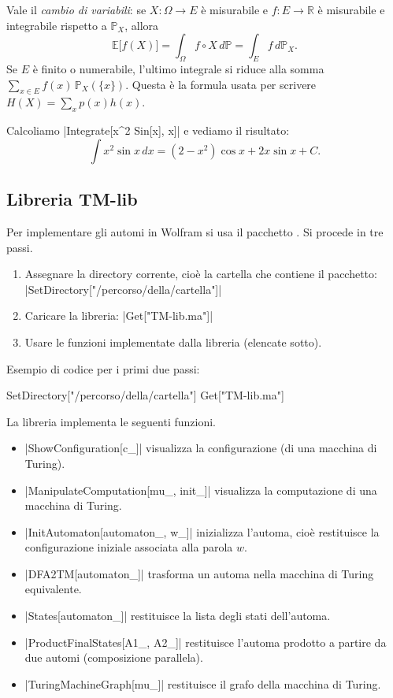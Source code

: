 \begin{rema}
Vale il \textit{cambio di variabili}: se $X\colon\Omega\to E$ è misurabile e $f\colon E\to\mathbb{R}$ è misurabile e integrabile rispetto a $\mathbb{P}_X$, allora
\[
\mathbb{E}\big[f(X)\big] = \int_{\Omega} f\circ X\, d\mathbb{P} = \int_{E} f\, d\mathbb{P}_X.
\]
Se $E$ è finito o numerabile, l'ultimo integrale si riduce alla somma $\sum_{x\in E} f(x)\,\mathbb{P}_X(\{x\})$. Questa è la formula usata per scrivere $H(X)=\sum_x p(x)h(x)$.
\end{rema}
\begin{rema}
Calcoliamo \wolfram|Integrate[x^2 Sin[x], x]| e vediamo il risultato:
\[
\int x^2 \sin x \, dx = (2 - x^2)\cos x + 2x \sin x + C.
\]
\end{rema}
\subsection{Libreria TM-lib}
\begin{defi}
Per implementare gli automi in Wolfram si usa il pacchetto . Si procede in tre passi.
\begin{enumerate}
\item Assegnare la directory corrente, cioè la cartella che contiene il pacchetto: \wolfram|SetDirectory["/percorso/della/cartella"]|
\item Caricare la libreria: \wolfram|Get["TM-lib.ma"]|
\item Usare le funzioni implementate dalla libreria (elencate sotto).
\end{enumerate}
\end{defi}
\begin{rema}
Esempio di codice per i primi due passi:
\begin{walfram}
SetDirectory["/percorso/della/cartella"]
Get["TM-lib.ma"]
\end{walfram}
\end{rema}
\begin{defi}
La libreria implementa le seguenti funzioni.
\begin{itemize}
\item \wolfram|ShowConfiguration[c_]| visualizza la configurazione (di una macchina di Turing).
\item \wolfram|ManipulateComputation[mu_, init_]| visualizza la computazione di una macchina di Turing.
\item \wolfram|InitAutomaton[automaton_, w_]| inizializza l'automa, cioè restituisce la configurazione iniziale associata alla parola $w$.
\item \wolfram|DFA2TM[automaton_]| trasforma un automa nella macchina di Turing equivalente.
\item \wolfram|States[automaton_]| restituisce la lista degli stati dell'automa.
\item \wolfram|ProductFinalStates[A1_, A2_]| restituisce l'automa prodotto a partire da due automi (composizione parallela).
\item \wolfram|TuringMachineGraph[mu_]| restituisce il grafo della macchina di Turing.
\end{itemize}
\end{defi}
